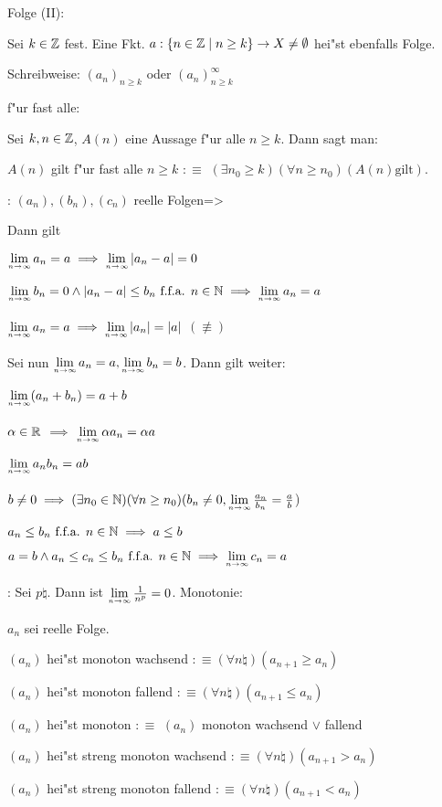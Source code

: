  Folge (II):{
  Sei $k\in\mathbb Z$ fest. Eine Fkt.
  $a:\{n\in\mathbb Z\mid n\ge k\}\to X\ne\emptyset$ hei"st
  ebenfalls Folge.
  
  Schreibweise: $(a_n)_{n\ge k}$ oder $(a_n)_{n\ge k}^{\infty}$
}
 f"ur fast alle:{
  Sei $k,n\in\mathbb Z$, $A(n)$ eine Aussage f"ur alle $n\ge k$.
  Dann sagt man:\par

  $A(n)$ gilt f"ur fast alle $n\ge k$ $:\equiv$
  $(\exists n_0\ge k)(\forall n\ge n_0)(A(n) \text{gilt})$.
}
\theorem: $(a_n),(b_n),(c_n)$ reelle Folgen=>{
  Dann gilt
  \begin{stmts}
    \item $\limn a_n=a \implies \limn |a_n-a|=0$ 
    \item $\limn b_n=0 \land |a_n-a|\le b_n \ffa n\natural
           \implies \limn a_n=a$
    \item $\limn a_n=a\implies \limn |a_n|=|a|$ $(\not\equiv)$
    \end{stmts}
  Sei nun $\limn a_n=a,\limn b_n=b$. Dann gilt weiter:
  \begin{stmts}
    \item $\limn (a_n+b_n)=a+b$
    \item $\alpha\in\mathbb R$ $\implies$ $\limn \alpha a_n=\alpha a$ 
    \item $\limn a_n b_n=ab$ 
    \item $b\ne 0\implies(\exists n_0\natural)(\forall n\ge n_0)(b_n\ne 0,
      \limn \frac{a_n}{b_n}=\frac a b$) 
    \item $a_n\le b_n \text{ f.f.a. } n\in\mathbb N \implies a\le b$ 
    \item $a=b \land a_n\le c_n \le b_n \ffa n\natural\implies
      \limn c_n=a$
    \end{stmts}
  }
\example:{
  Sei $p\natural$. Dann ist $\limn \frac 1 {n^p}=0$.
  }
 Monotonie:{
  $a_n$ sei reelle Folge.
  \begin{stmts}
    \item $(a_n)$ hei"st monoton wachsend $:\equiv (\forall n\natural)(a_{n+1}\ge a_n)$
    \item $(a_n)$ hei"st monoton fallend $:\equiv (\forall n\natural)(a_{n+1}\le a_n)$
    \item $(a_n)$ hei"st monoton $:\equiv$ $(a_n)$ monoton wachsend $\lor$ fallend
    \item $(a_n)$ hei"st streng monoton wachsend $:\equiv (\forall n\natural)(a_{n+1}>a_n)$
    \item $(a_n)$ hei"st streng monoton fallend $:\equiv (\forall n\natural)(a_{n+1}<a_n)$
    \end{stmts}
  }
